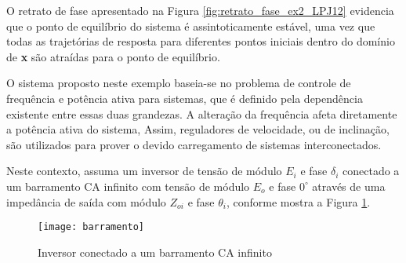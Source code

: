O retrato de fase apresentado na Figura \ref{fig:retrato_fase_ex2_LPJ12} evidencia que o ponto de equilíbrio do sistema é assintoticamente estável, uma vez que todas as trajetórias de resposta para diferentes pontos iniciais dentro do domínio de \textbf{x} são atraídas para o ponto de equilíbrio.

\begin{example}  O sistema proposto neste exemplo baseia-se no problema de controle de frequência e potência ativa para sistemas, que é definido pela dependência existente entre essas duas grandezas. A alteração da frequência afeta diretamente a potência ativa do sistema, Assim, reguladores de velocidade, ou de inclinação, são utilizados para prover o devido carregamento de sistemas interconectados.

Neste contexto, assuma um inversor de tensão de módulo $E_i$ e fase $\delta_i$ conectado a um barramento CA infinito com tensão de módulo $E_o$ e fase $0^{\circ}$ através de uma impedância de saída com módulo $Z_{oi}$ e fase $\theta_i$, conforme mostra a Figura \ref{fig:inversor_CA}.

\begin{figure}[htbp]
	\centering
	\texttt{[image: barramento]}
	\caption{Inversor conectado a um barramento CA infinito}
	 \label{fig:inversor_CA}
\end{figure}


\end{example}
